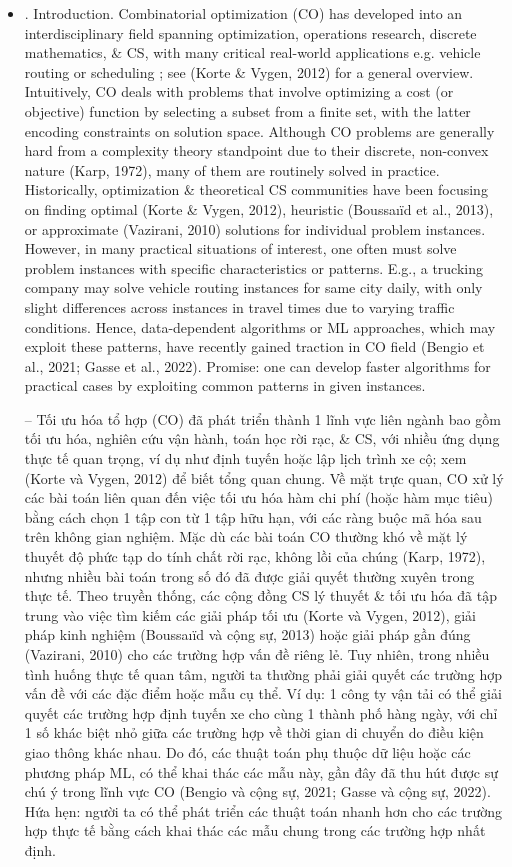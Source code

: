 \documentclass{article}
\begin{document}
\begin{itemize}
    {\bf Keywords.} Combinatorial optimization, graph neural networks, reasoning.
   \item {. Introduction.} Combinatorial optimization (CO) has developed into an interdisciplinary field spanning optimization, operations research, discrete mathematics, \& CS, with many critical real-world applications e.g. vehicle routing or scheduling ; see (Korte \& Vygen, 2012) for a general overview. Intuitively, CO deals with problems that involve optimizing a cost (or objective) function by selecting a subset from a finite set, with the latter encoding constraints on solution space. Although CO problems are generally hard from a complexity theory standpoint due to their discrete, non-convex nature (Karp, 1972), many of them are routinely solved in practice. Historically, optimization \& theoretical CS communities have been focusing on finding optimal (Korte \& Vygen, 2012), heuristic (Boussaı\"id et al., 2013), or approximate (Vazirani, 2010) solutions for individual problem instances. However, in many practical situations of interest, one often must solve problem instances with specific characteristics or patterns. E.g., a trucking company may solve vehicle routing instances for same city daily, with only slight differences across instances in travel times due to varying traffic conditions. Hence, data-dependent algorithms or ML approaches, which may exploit these patterns, have recently gained traction in CO field (Bengio et al., 2021; Gasse et al., 2022). Promise: one can develop faster algorithms for practical cases by exploiting common patterns in given instances.

   -- Tối ưu hóa tổ hợp (CO) đã phát triển thành 1 lĩnh vực liên ngành bao gồm tối ưu hóa, nghiên cứu vận hành, toán học rời rạc, \& CS, với nhiều ứng dụng thực tế quan trọng, ví dụ như định tuyến hoặc lập lịch trình xe cộ; xem (Korte và Vygen, 2012) để biết tổng quan chung. Về mặt trực quan, CO xử lý các bài toán liên quan đến việc tối ưu hóa hàm chi phí (hoặc hàm mục tiêu) bằng cách chọn 1 tập con từ 1 tập hữu hạn, với các ràng buộc mã hóa sau trên không gian nghiệm. Mặc dù các bài toán CO thường khó về mặt lý thuyết độ phức tạp do tính chất rời rạc, không lồi của chúng (Karp, 1972), nhưng nhiều bài toán trong số đó đã được giải quyết thường xuyên trong thực tế. Theo truyền thống, các cộng đồng CS lý thuyết \& tối ưu hóa đã tập trung vào việc tìm kiếm các giải pháp tối ưu (Korte và Vygen, 2012), giải pháp kinh nghiệm (Boussaı\"id và cộng sự, 2013) hoặc giải pháp gần đúng (Vazirani, 2010) cho các trường hợp vấn đề riêng lẻ. Tuy nhiên, trong nhiều tình huống thực tế quan tâm, người ta thường phải giải quyết các trường hợp vấn đề với các đặc điểm hoặc mẫu cụ thể. Ví dụ: 1 công ty vận tải có thể giải quyết các trường hợp định tuyến xe cho cùng 1 thành phố hàng ngày, với chỉ 1 số khác biệt nhỏ giữa các trường hợp về thời gian di chuyển do điều kiện giao thông khác nhau. Do đó, các thuật toán phụ thuộc dữ liệu hoặc các phương pháp ML, có thể khai thác các mẫu này, gần đây đã thu hút được sự chú ý trong lĩnh vực CO (Bengio và cộng sự, 2021; Gasse và cộng sự, 2022). Hứa hẹn: người ta có thể phát triển các thuật toán nhanh hơn cho các trường hợp thực tế bằng cách khai thác các mẫu chung trong các trường hợp nhất định.


\end{itemize}
\end{document}
